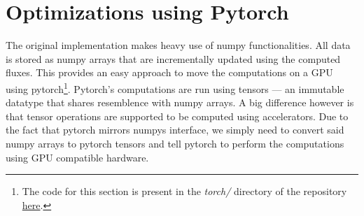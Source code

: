 \documentclass[a4paper,10pt]{article}
\begin{document}

\section{Optimizations using Pytorch}
The original implementation makes heavy use of numpy functionalities.
All data is stored as numpy arrays that are incrementally updated using the computed fluxes.
This provides an easy approach to move the computations on a GPU using pytorch\footnote{The code for this section is present in the \textit{torch/} directory of the repository \href{https://github.com/paulmyr/DD2358-HPC25/blob/master/10_project_rishi_paul/code/torch/runtimeplots_with_gpu.py}{here}.}.
Pytorch's computations are run using tensors --- an immutable datatype that shares resemblence with numpy arrays.
A big difference however is that tensor operations are supported to be computed using accelerators.
Due to the fact that pytorch mirrors numpys interface, we simply need to convert said numpy arrays to pytorch tensors
and tell pytorch to perform the computations using GPU compatible hardware.
\end{document}

